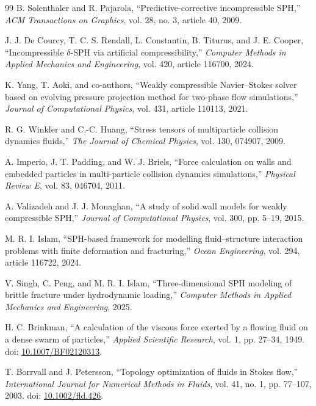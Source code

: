 \documentclass[11pt,a4paper]{article}
\begin{document}
\begin{thebibliography}{99}
B. Solenthaler and R. Pajarola,
``Predictive-corrective incompressible SPH,''
\emph{ACM Transactions on Graphics}, vol. 28, no. 3, article 40, 2009.

J. J. De Courcy, T. C. S. Rendall, L. Constantin, B. Titurus, and J. E. Cooper,
``Incompressible $\delta$-SPH via artificial compressibility,''
\emph{Computer Methods in Applied Mechanics and Engineering}, vol. 420, article 116700, 2024.

K. Yang, T. Aoki, and co-authors,
``Weakly compressible Navier--Stokes solver based on evolving pressure projection method for two-phase flow simulations,''
\emph{Journal of Computational Physics}, vol. 431, article 110113, 2021.

R. G. Winkler and C.-C. Huang,
``Stress tensors of multiparticle collision dynamics fluids,''
\emph{The Journal of Chemical Physics}, vol. 130, 074907, 2009.

A. Imperio, J. T. Padding, and W. J. Briels,
``Force calculation on walls and embedded particles in multi-particle collision dynamics simulations,''
\emph{Physical Review E}, vol. 83, 046704, 2011.

A. Valizadeh and J. J. Monaghan,
``A study of solid wall models for weakly compressible SPH,''
\emph{Journal of Computational Physics}, vol. 300, pp. 5--19, 2015.

M. R. I. Islam,
``SPH-based framework for modelling fluid--structure interaction problems with finite deformation and fracturing,''
\emph{Ocean Engineering}, vol. 294, article 116722, 2024.

V. Singh, C. Peng, and M. R. I. Islam,
``Three-dimensional SPH modeling of brittle fracture under hydrodynamic loading,''
\emph{Computer Methods in Applied Mechanics and Engineering}, 2025.


H. C. Brinkman,
``A calculation of the viscous force exerted by a flowing fluid on a dense swarm of particles,''
\emph{Applied Scientific Research}, vol. 1, pp. 27--34, 1949.
doi: \href{https://doi.org/10.1007/BF02120313}{10.1007/BF02120313}.

T. Borrvall and J. Petersson,
``Topology optimization of fluids in Stokes flow,''
\emph{International Journal for Numerical Methods in Fluids}, vol. 41, no. 1, pp. 77--107, 2003.
doi: \href{https://doi.org/10.1002/fld.426}{10.1002/fld.426}.


\end{thebibliography}
\end{document}
